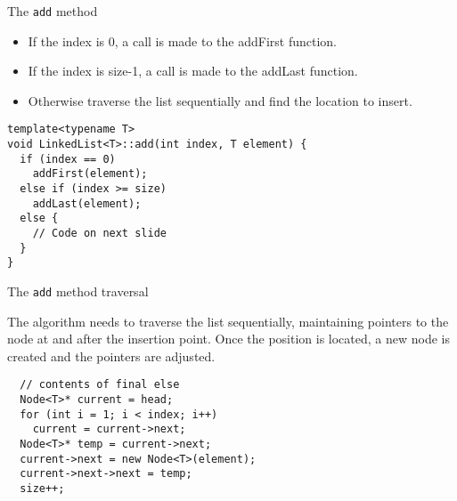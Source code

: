 \documentclass{beamer}
\begin{document}
\begin{frame}[fragile]{The \lstinline$add$ method }

\begin{itemize}
\item If the index is 0, a call is made to the addFirst function.
\item If the index is size-1, a call is made to the addLast function.
\item Otherwise traverse the list sequentially and find the location to insert.
\end{itemize}

\begin{lstlisting}
template<typename T>
void LinkedList<T>::add(int index, T element) {
  if (index == 0)
    addFirst(element);
  else if (index >= size)
    addLast(element);
  else {
    // Code on next slide
  }
}
\end{lstlisting}

\end{frame}


\begin{frame}[fragile]{The \lstinline$add$ method traversal}

The algorithm needs to traverse the
list sequentially, maintaining pointers to the
node at and after the insertion point. Once the
position is located, a new node is created and
the pointers are adjusted.

\begin{lstlisting}
  // contents of final else
  Node<T>* current = head;
  for (int i = 1; i < index; i++)
    current = current->next;
  Node<T>* temp = current->next;
  current->next = new Node<T>(element);
  current->next->next = temp;
  size++;
\end{lstlisting}

\end{frame}

\end{document}
